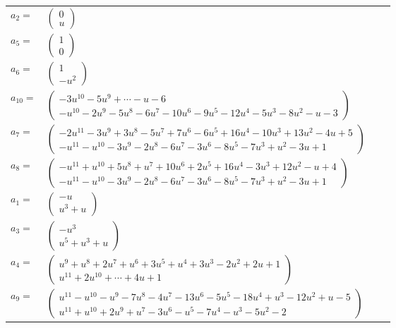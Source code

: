 \documentclass[1p]{elsarticle_modified}
\theoremstyle{definition}
\begin{document}
\begin{tabular}{m{7pt} m{180pt} m{7pt} m{180pt} }
\flushright $a_{2}=$&$\begin{pmatrix}0\\u\end{pmatrix}$ \\
\flushright $a_{5}=$&$\begin{pmatrix}1\\0\end{pmatrix}$ \\
\flushright $a_{6}=$&$\begin{pmatrix}1\\- u^2\end{pmatrix}$ \\
\flushright $a_{10}=$&$\begin{pmatrix}-3 u^{10}-5 u^9+\cdots- u-6\\- u^{10}-2 u^9-5 u^8-6 u^7-10 u^6-9 u^5-12 u^4-5 u^3-8 u^2- u-3\end{pmatrix}$ \\
\flushright $a_{7}=$&$\begin{pmatrix}-2 u^{11}-3 u^9+3 u^8-5 u^7+7 u^6-6 u^5+16 u^4-10 u^3+13 u^2-4 u+5\\- u^{11}- u^{10}-3 u^9-2 u^8-6 u^7-3 u^6-8 u^5-7 u^3+u^2-3 u+1\end{pmatrix}$ \\
\flushright $a_{8}=$&$\begin{pmatrix}- u^{11}+u^{10}+5 u^8+u^7+10 u^6+2 u^5+16 u^4-3 u^3+12 u^2- u+4\\- u^{11}- u^{10}-3 u^9-2 u^8-6 u^7-3 u^6-8 u^5-7 u^3+u^2-3 u+1\end{pmatrix}$ \\
\flushright $a_{1}=$&$\begin{pmatrix}- u\\u^3+u\end{pmatrix}$ \\
\flushright $a_{3}=$&$\begin{pmatrix}- u^3\\u^5+u^3+u\end{pmatrix}$ \\
\flushright $a_{4}=$&$\begin{pmatrix}u^9+u^8+2 u^7+u^6+3 u^5+u^4+3 u^3-2 u^2+2 u+1\\u^{11}+2 u^{10}+\cdots+4 u+1\end{pmatrix}$ \\
\flushright $a_{9}=$&$\begin{pmatrix}u^{11}- u^{10}- u^9-7 u^8-4 u^7-13 u^6-5 u^5-18 u^4+u^3-12 u^2+u-5\\u^{11}+u^{10}+2 u^9+u^7-3 u^6- u^5-7 u^4- u^3-5 u^2-2\end{pmatrix}$ \\

\end{tabular}
\end{document}
